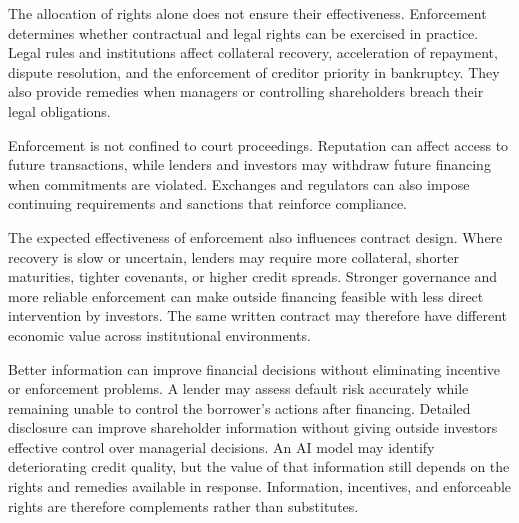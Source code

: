 The allocation of rights alone does not ensure their effectiveness. Enforcement determines whether contractual and legal rights can be exercised in practice. Legal rules and institutions affect collateral recovery, acceleration of repayment, dispute resolution, and the enforcement of creditor priority in bankruptcy. They also provide remedies when managers or controlling shareholders breach their legal obligations.

Enforcement is not confined to court proceedings. Reputation can affect access to future transactions, while lenders and investors may withdraw future financing when commitments are violated. Exchanges and regulators can also impose continuing requirements and sanctions that reinforce compliance.

The expected effectiveness of enforcement also influences contract design. Where recovery is slow or uncertain, lenders may require more collateral, shorter maturities, tighter covenants, or higher credit spreads. Stronger governance and more reliable enforcement can make outside financing feasible with less direct intervention by investors. The same written contract may therefore have different economic value across institutional environments.

\begin{tcolorbox}[
  enhanced,
  breakable,
  colback=white,
  colframe=FinanceBlue,
  boxrule=0.7pt,
  sharp corners,
  borderline west={2.2pt}{0pt}{FinanceBlue},
  title=\textbf{Financial Perspective: Information Alone Does Not Solve the Contracting Problem},
  coltitle=white,
  colbacktitle=FinanceBlue,
  fonttitle=\bfseries,
  before skip=1.2em,
  after skip=1.2em
]

Better information can improve financial decisions without eliminating incentive or enforcement problems. A lender may assess default risk accurately while remaining unable to control the borrower's actions after financing. Detailed disclosure can improve shareholder information without giving outside investors effective control over managerial decisions. An AI model may identify deteriorating credit quality, but the value of that information still depends on the rights and remedies available in response. Information, incentives, and enforceable rights are therefore complements rather than substitutes.

\end{tcolorbox}


